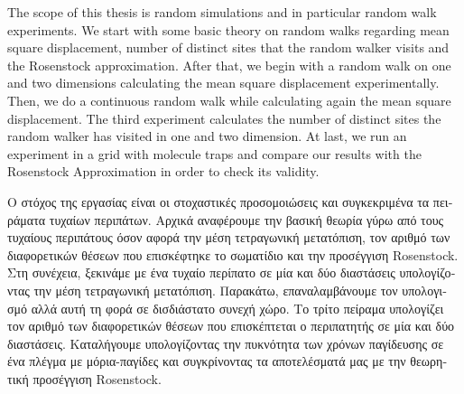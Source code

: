 \newpage
\thispagestyle{plain}

\vspace*{\fill}
\begin{center}
    \vspace{0.9cm}
    \textbf{}
\end{center}
{\en The scope of this thesis is random simulations and in particular random walk experiments. We start with some basic theory on random walks regarding mean square displacement, number of distinct sites that the random walker visits and the Rosenstock approximation. After that, we begin with a random walk on one and two dimensions calculating the mean square displacement experimentally. Then, we do a continuous random walk while calculating again the mean square displacement. The third experiment calculates the number of distinct sites the random walker has visited in one and two dimension. At last, we run an experiment in a grid with molecule traps and compare our results with the Rosenstock Approximation in order to check its validity.}
\vspace*{\fill}
\newpage
\vspace*{\fill}
\begin{center}
    \vspace{0.9cm}
    \textbf{}
\begin{otherlanguage}{greek}

Ο στόχος της εργασίας είναι οι στοχαστικές προσομοιώσεις και συγκεκριμένα τα πειράματα τυχαίων περιπάτων. Αρχικά αναφέρουμε την βασική θεωρία γύρω από τους τυχαίους περιπάτους όσον αφορά την μέση τετραγωνική μετατόπιση, τον αριθμό των διαφορετικών θέσεων που επισκέφτηκε το σωματίδιο και την προσέγγιση {\en Rosenstock}. Στη συνέχεια, ξεκινάμε με ένα τυχαίο περίπατο σε μία και δύο διαστάσεις υπολογίζοντας την μέση τετραγωνική μετατόπιση. Παρακάτω, επαναλαμβάνουμε τον υπολογισμό αλλά αυτή τη φορά σε δισδιάστατο συνεχή χώρο. Το τρίτο πείραμα υπολογίζει τον αριθμό των διαφορετικών θέσεων που επισκέπτεται ο περιπατητής σε μία και δύο διαστάσεις. Καταλήγουμε υπολογίζοντας την πυκνότητα των χρόνων παγίδευσης σε ένα πλέγμα με μόρια-παγίδες και συγκρίνοντας τα αποτελέσματά μας με την θεωρητική προσέγγιση {\en Rosenstock}.
\end{otherlanguage}
\end{center}
\begin{otherlanguage}{greek}
\end{otherlanguage}
\vspace*{\fill}
